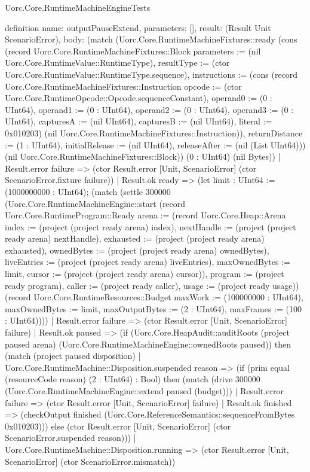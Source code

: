 \begin{lexlean}{Uorc.Core.RuntimeMachineEngineTests}
\begin{semanticmodule}
definition{
  name: outputPauseExtend,
  parameters: [],
  result: (Result Unit ScenarioError),
  body: (match (Uorc.Core.RuntimeMachineFixtures::ready (cons (record Uorc.Core.RuntimeMachineFixtures::Block {parameters := (nil Uorc.Core.RuntimeValue::RuntimeType), resultType := (ctor Uorc.Core.RuntimeValue::RuntimeType.sequence), instructions := (cons (record Uorc.Core.RuntimeMachineFixtures::Instruction {opcode := (ctor Uorc.Core.RuntimeOpcode::Opcode.sequenceConstant), operand0 := (0 : UInt64), operand1 := (0 : UInt64), operand2 := (0 : UInt64), operand3 := (0 : UInt64), capturesA := (nil UInt64), capturesB := (nil UInt64), literal := 0x010203}) (nil Uorc.Core.RuntimeMachineFixtures::Instruction)), returnDistance := (1 : UInt64), initialRelease := (nil UInt64), releaseAfter := (nil (List UInt64))}) (nil Uorc.Core.RuntimeMachineFixtures::Block)) (0 : UInt64) (nil Bytes))
    | Result.error failure => (ctor Result.error [Unit, ScenarioError] (ctor ScenarioError.fixture failure))
    | Result.ok ready => (let limit : UInt64 := (1000000000 : UInt64); (match (settle 300000 (Uorc.Core.RuntimeMachineEngine::start (record Uorc.Core.RuntimeProgram::Ready {arena := (record Uorc.Core.Heap::Arena {index := (project (project ready arena) index), nextHandle := (project (project ready arena) nextHandle), exhausted := (project (project ready arena) exhausted), ownedBytes := (project (project ready arena) ownedBytes), liveEntries := (project (project ready arena) liveEntries), maxOwnedBytes := limit, cursor := (project (project ready arena) cursor)}), program := (project ready program), caller := (project ready caller), usage := (project ready usage)}) (record Uorc.Core.RuntimeResources::Budget {maxWork := (100000000 : UInt64), maxOwnedBytes := limit, maxOutputBytes := (2 : UInt64), maxFrames := (100 : UInt64)})))
      | Result.error failure => (ctor Result.error [Unit, ScenarioError] failure)
      | Result.ok paused => (if (Uorc.Core.HeapAudit::auditRoots (project paused arena) (Uorc.Core.RuntimeMachineEngine::ownedRoots paused)) then (match (project paused disposition)
        | Uorc.Core.RuntimeMachine::Disposition.suspended reason => (if (prim equal (resourceCode reason) (2 : UInt64) : Bool) then (match (drive 300000 (Uorc.Core.RuntimeMachineEngine::extend paused (budget)))
          | Result.error failure => (ctor Result.error [Unit, ScenarioError] failure)
          | Result.ok finished => (checkOutput finished (Uorc.Core.ReferenceSemantics::sequenceFromBytes 0x010203))) else (ctor Result.error [Unit, ScenarioError] (ctor ScenarioError.suspended reason)))
        | Uorc.Core.RuntimeMachine::Disposition.running => (ctor Result.error [Unit, ScenarioError] (ctor ScenarioError.mismatch))
}
\end{semanticmodule}
\end{lexlean}
